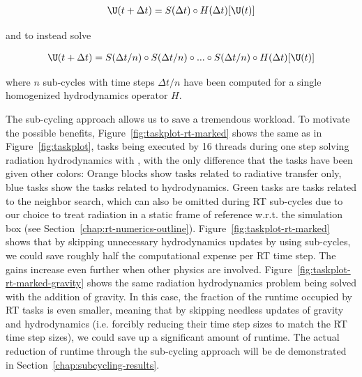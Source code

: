 \begin{align}
    \U(t + \Delta t) = S(\Delta t) \circ H(\Delta t)[\U(t)]
\end{align}

and to instead solve

\begin{align}
    \U(t + \Delta t) =
        S(\Delta t/n) \circ S(\Delta t/n) \circ ... \circ S(\Delta t/n) \circ H(\Delta t)[\U(t)]
\end{align}

where $n$ sub-cycles with time steps $\Delta t/n$ have been computed for a single homogenized
hydrodynamics operator $H$.


The sub-cycling approach allows us to save a tremendous workload. To motivate the possible benefits,
Figure~\ref{fig:taskplot-rt-marked} shows the same as in Figure~\ref{fig:taskplot}, tasks being
executed by 16 threads during one step solving radiation hydrodynamics with \swift, with the only
difference that the tasks have been given other colors: Orange blocks show tasks related to
radiative transfer only, blue tasks show the tasks related to hydrodynamics. Green tasks are tasks
related to the neighbor search, which can also be omitted during RT sub-cycles due to our choice to
treat radiation in a static frame of reference w.r.t. the simulation box (see
Section~\ref{chap:rt-numerics-outline}). Figure~\ref{fig:taskplot-rt-marked} shows that by skipping
unnecessary hydrodynamics updates by using sub-cycles, we could save roughly half the computational
expense per RT time step. The gains increase even further when other physics are involved.
Figure~\ref{fig:taskplot-rt-marked-gravity} shows the same radiation hydrodynamics problem being
solved with the addition of gravity. In this case, the fraction of the runtime occupied by RT tasks
is even smaller, meaning that by skipping needless updates of gravity and hydrodynamics (i.e.
forcibly reducing their time step sizes to match the RT time step sizes), we could save up a
significant amount of runtime. The actual reduction of runtime through the sub-cycling approach will
be de demonstrated in Section~\ref{chap:subcycling-results}.



